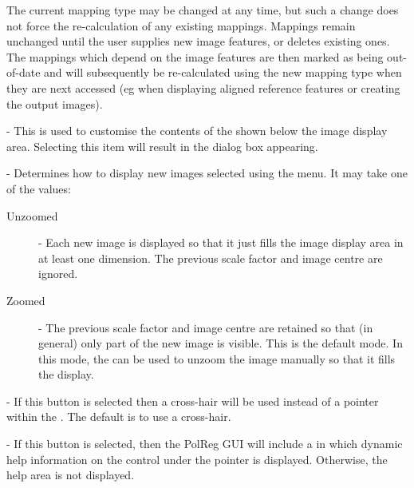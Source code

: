 \begin{description}
The current mapping type may be changed at any time, but such a change
does not force the re-calculation of any existing mappings. Mappings
remain unchanged until the user supplies new image features, or deletes
existing ones. The mappings which depend on the image features are then
marked as being out-of-date and will subsequently be re-calculated using
the new mapping type when they are next accessed (eg when displaying
aligned reference features or creating the output images).

\item [\mylabel{POLREG_STATUS_ITEMS}{\em Status Items}] - This is used to
customise the contents of the 
shown below the image display area. Selecting this item will result in the 
 dialog
box appearing.

\item [\mylabel{POLREG_VIEW}{\em View}] - Determines how to display new
images selected using the 
menu. It may take one of the values:

\begin{description}

\item [Unzoomed] - Each new image is displayed so that it just fills the 
image display area in at least one dimension. The previous scale factor
and image centre are ignored.

\item [Zoomed] - The previous scale factor and image centre are retained
so that (in general) only part of the new image is visible. This is the
default mode. In this mode, the  can
be used to unzoom the image manually so that it fills the display.

\end{description}

\item [\mylabel{POLREG_USE_CROSS_HAIR}{\em Use Cross-hair}] -
If this button is selected then a cross-hair will be used instead of a
pointer within the .
The default is to use a cross-hair.

\item [\mylabel{POLREG_DISPLAY_HELP_AREA}{\em Display Help Area}] - 
If this button is selected, then the PolReg GUI will include a
 in which dynamic help information
on the control under the pointer is displayed. Otherwise, the help area
is not displayed.


\end{description}
